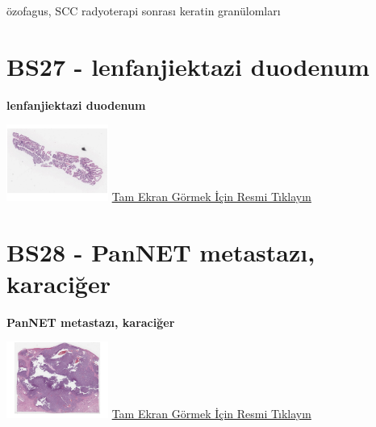 \documentclass[
  letterpaper,
  DIV=11,
  numbers=noendperiod]{scrreprt}
\begin{document}
\begin{tcolorbox}[enhanced jigsaw, left=2mm, toprule=.15mm, rightrule=.15mm, bottomrule=.15mm, leftrule=.75mm, colback=white, colframe=quarto-callout-tip-color-frame, toptitle=1mm, breakable, titlerule=0mm, colbacktitle=quarto-callout-tip-color!10!white, bottomtitle=1mm, title=\textcolor{quarto-callout-tip-color}{\faLightbulb}\hspace{0.5em}{Tanı}, arc=.35mm, opacitybacktitle=0.6, opacityback=0, coltitle=black]

özofagus, SCC radyoterapi sonrası keratin granülomları

\end{tcolorbox}

\hypertarget{sec-BS27}{%
\section{BS27 - lenfanjiektazi duodenum}\label{sec-BS27}}

\textbf{lenfanjiektazi duodenum}

\href{https://images.patolojiatlasi.com/BS27/HE.html}{\includegraphics[width=0.25\textwidth,height=\textheight]{./screenshots/BS27-HE_screenshot.png}}
\href{https://images.patolojiatlasi.com/BS27/HE.html}{Tam Ekran Görmek
İçin Resmi Tıklayın}

\hypertarget{sec-BS28}{%
\section{BS28 - PanNET metastazı, karaciğer}\label{sec-BS28}}

\textbf{PanNET metastazı, karaciğer}

\href{https://images.patolojiatlasi.com/BS28/HE.html}{\includegraphics[width=0.25\textwidth,height=\textheight]{./screenshots/BS28-HE_screenshot.png}}
\href{https://images.patolojiatlasi.com/BS28/HE.html}{Tam Ekran Görmek
İçin Resmi Tıklayın}
\end{document}
